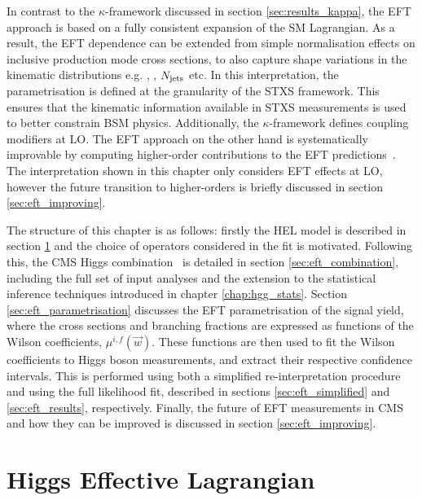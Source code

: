 In contrast to the $\kappa$-framework discussed in section \ref{sec:results_kappa}, the EFT approach is based on a fully consistent expansion of the SM Lagrangian. As a result, the EFT dependence can be extended from simple normalisation effects on inclusive production mode cross sections, to also capture shape variations in the kinematic distributions e.g. \ptH, \mjj, $N_{\rm{jets}}$ etc. In this interpretation, the parametrisation is defined at the granularity of the STXS framework. This ensures that the kinematic information available in STXS measurements is used to better constrain BSM physics. Additionally, the $\kappa$-framework defines coupling modifiers at LO. The EFT approach on the other hand is systematically improvable by computing higher-order contributions to the EFT predictions~\cite{Degrande:2020evl}. The interpretation shown in this chapter only considers EFT effects at LO, however the future transition to higher-orders is briefly discussed in section \ref{sec:eft_improving}.

The structure of this chapter is as follows: firstly the HEL model is described in section \ref{sec:eft_hel} and the choice of operators considered in the fit is motivated. Following this, the CMS Higgs combination~\cite{CMS-PAS-HIG-19-005} is detailed in section \ref{sec:eft_combination}, including the full set of input analyses and the extension to the statistical inference techniques introduced in chapter \ref{chap:hgg_stats}. Section \ref{sec:eft_parametrisation} discusses the EFT parametrisation of the signal yield, where the cross sections and branching fractions are expressed as functions of the Wilson coefficients, $\mu^{i,f}(\vec{w})$. These functions are then used to fit the Wilson coefficients to Higgs boson measurements, and extract their respective confidence intervals. This is performed using both a simplified re-interpretation procedure and using the full likelihood fit, described in sections \ref{sec:eft_simplified} and \ref{sec:eft_results}, respectively. Finally, the future of EFT measurements in CMS and how they can be improved is discussed in section \ref{sec:eft_improving}.

\section{Higgs Effective Lagrangian}\label{sec:eft_hel}


